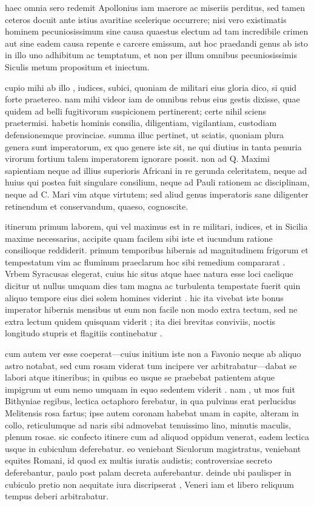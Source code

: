  haec omnia sero redemit Apollonius iam maerore ac miseriis perditus, sed tamen ceteros docuit ante istius avaritiae scelerique occurrere; nisi vero existimatis hominem pecuniosissimum sine causa quaestus electum ad tam incredibile crimen aut sine eadem causa repente e carcere emissum, aut hoc praedandi genus ab isto in illo uno adhibitum ac temptatum, et non per illum omnibus pecuniosissimis Siculis metum propositum et iniectum.

 cupio mihi ab illo , iudices, subici, quoniam de militari eius gloria dico, si quid forte praetereo. nam mihi videor iam de omnibus rebus eius gestis dixisse, quae quidem ad belli fugitivorum suspicionem pertinerent; certe nihil sciens praetermisi. habetis hominis consilia, diligentiam, vigilantiam, custodiam defensionemque provinciae. summa illuc pertinet, ut sciatis, quoniam plura genera sunt imperatorum, ex quo genere iste sit, ne qui diutius in tanta penuria virorum fortium talem imperatorem ignorare possit. non ad Q. Maximi sapientiam neque ad illius superioris Africani in re gerunda celeritatem, neque ad huius qui postea fuit singulare consilium, neque ad Pauli rationem ac disciplinam, neque ad C. Mari vim atque virtutem; sed aliud genus imperatoris sane diligenter retinendum et conservandum, quaeso, cognoscite.

 itinerum primum laborem, qui vel maximus est in re militari, iudices, et in Sicilia maxime necessarius, accipite quam facilem sibi iste et iucundum ratione consilioque reddiderit. primum temporibus hibernis ad magnitudinem frigorum et tempestatum vim ac fluminum praeclarum hoc sibi remedium compararat . Vrbem Syracusas elegerat, cuius hic situs atque haec natura esse loci caelique dicitur ut nullus umquam dies tam magna ac turbulenta tempestate fuerit quin aliquo tempore eius diei solem homines viderint . hic ita vivebat iste bonus imperator hibernis mensibus ut eum non facile non modo extra tectum, sed ne extra lectum quidem quisquam viderit ; ita diei brevitas conviviis, noctis longitudo stupris et flagitiis continebatur .

 cum autem ver esse coeperat—cuius initium iste non a Favonio neque ab aliquo astro notabat, sed cum rosam viderat tum incipere ver arbitrabatur—dabat se labori atque itineribus; in quibus eo usque se praebebat patientem atque impigrum ut eum nemo umquam in equo sedentem viderit . nam , ut mos fuit Bithyniae regibus, lectica octaphoro ferebatur, in qua pulvinus erat perlucidus Melitensis rosa fartus; ipse autem coronam habebat unam in capite, alteram in collo, reticulumque ad naris sibi admovebat tenuissimo lino, minutis maculis, plenum rosae. sic confecto itinere cum ad aliquod oppidum venerat, eadem lectica usque in cubiculum deferebatur. eo veniebant Siculorum magistratus, veniebant equites Romani, id quod ex multis iuratis audistis; controversiae secreto deferebantur, paulo post palam decreta auferebantur. deinde ubi paulisper in cubiculo pretio non aequitate iura discripserat , Veneri iam et libero reliquum tempus deberi arbitrabatur.

